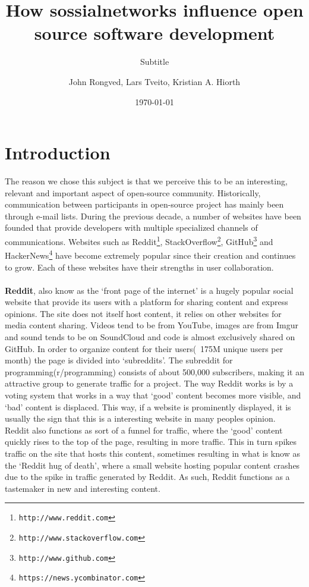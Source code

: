 \documentclass[a4paper,11pt,oneside]{book} %
\title{How sossialnetworks influence open source software development}
\subtitle{Subtitle}
\author{John Rongved, Lars Tveito, Kristian A. Hiorth}
\date{\today}
\begin{document}
\ififorside

\frontmatter

  \tableofcontents

  \mainmatter

\section{Introduction}

The reason we chose this subject is that we perceive this to be an interesting, relevant and important aspect of open-source community. Historically, communication between participants in open-source project has mainly been through e-mail lists. During the previous decade, a number of websites have been founded that provide developers with multiple specialized channels of communications. Websites such as  Reddit\footnote{\texttt{http://www.reddit.com}}, StackOverflow\footnote{\texttt{http://www.stackoverflow.com}}, GitHub\footnote{\texttt{http://www.github.com}} and HackerNews\footnote{\texttt{https://news.ycombinator.com}} have become extremely popular since their creation and continues to grow. Each of these websites have their strengths in user collaboration. 
\\\\
\textbf{Reddit}, also know as the ‘front page of the internet’ is a hugely popular social website that provide its users with a platform for sharing content and express opinions. The site does not itself host content, it relies on other websites for media content sharing. Videos tend to be from YouTube, images are from Imgur and sound tends to be on SoundCloud and code is almost exclusively shared on GitHub. In order to organize content for their users(~175M unique users per month) the page is divided into ‘subreddits’. The subreddit for programming(r/programming) consists of about 500,000 subscribers, making it an attractive group to generate traffic for a project. The way Reddit works is by a voting system that works in a way that ‘good’ content becomes more visible, and ‘bad’ content is displaced. This way, if a website is prominently displayed, it is usually the sign that this is a interesting website in many peoples opinion.
\\
Reddit also functions as sort of a funnel for traffic, where the ‘good’ content quickly rises to the top of the page, resulting in more traffic. This in turn spikes traffic on the site that hosts this content, sometimes resulting in what is know as the ‘Reddit hug of death’, where a small website hosting popular content crashes due to the spike in traffic generated by Reddit. As such, Reddit functions as a tastemaker in new and interesting content. 
\end{document}

